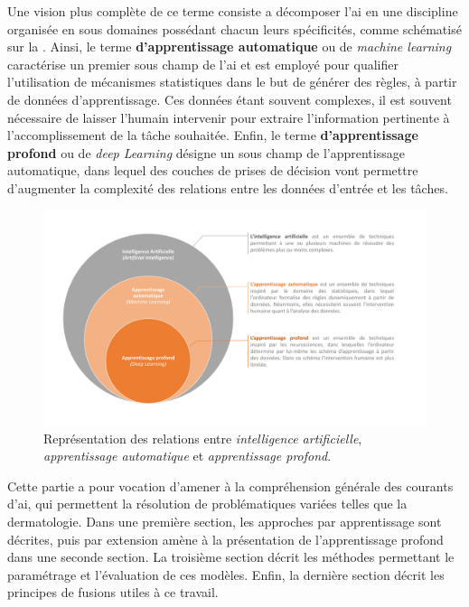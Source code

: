 Une vision plus complète de ce terme consiste a décomposer l'\gls{ai} en une discipline organisée en sous domaines possédant chacun leurs spécificités, comme schématisé sur la . Ainsi, le terme \textbf{d'apprentissage automatique} ou de \textit{machine learning} caractérise un premier sous champ de l'\gls{ai} et est employé pour qualifier l'utilisation de mécanismes statistiques dans le but de générer des règles, à partir de données d'apprentissage. Ces données étant souvent complexes, il est souvent nécessaire de laisser l'humain intervenir pour extraire l'information pertinente à l'accomplissement de la tâche souhaitée. Enfin, le terme \textbf{d'apprentissage profond} ou de \textit{deep Learning} désigne un sous champ de l'apprentissage automatique, dans lequel des couches de prises de décision vont permettre d'augmenter la complexité des relations entre les données d'entrée et les tâches.\par

\addtocounter{footnote}{1}

\begin{figure}[H]
    \centering
    \includegraphics[width=\linewidth]{contents/chapter_3/resources/scheme_overview_ia.pdf}
    \caption{Représentation des relations entre \textit{intelligence artificielle}, \textit{apprentissage automatique} et \textit{apprentissage profond}.}
    \label{fig:scheme_overview_ia}
\end{figure}\par

Cette partie a pour vocation d’amener à la compréhension générale des courants d’\gls{ai}, qui permettent la résolution de problématiques variées telles que la dermatologie. Dans une première section, les approches par apprentissage sont décrites, puis par extension amène à la présentation de l'apprentissage profond dans une seconde section. La troisième section décrit les méthodes permettant le paramétrage et l'évaluation de ces modèles. Enfin, la dernière section décrit les principes de fusions utiles à ce travail.\par

